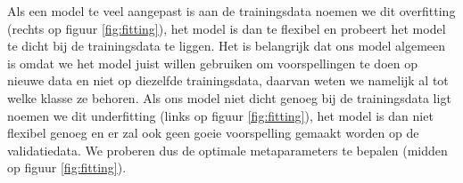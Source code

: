 \documentclass[TeamE-eindrapport]{subfiles}
\begin{document}
	Als een model te veel aangepast is aan de trainingsdata noemen we dit overfitting (rechts op figuur \ref{fig:fitting}), het model is dan te flexibel en probeert het model te dicht bij de trainingsdata te liggen. Het is belangrijk dat ons model algemeen is omdat we het model juist willen gebruiken om voorspellingen te doen op nieuwe data en niet op diezelfde trainingsdata, daarvan weten we namelijk al tot welke klasse ze behoren. Als ons model niet dicht genoeg bij de trainingsdata ligt noemen we dit underfitting (links op figuur \ref{fig:fitting}), het model is dan niet flexibel genoeg en er zal ook geen goeie voorspelling gemaakt worden op de validatiedata. We proberen dus de optimale metaparameters te bepalen (midden op figuur \ref{fig:fitting}).
	
\end{document}
